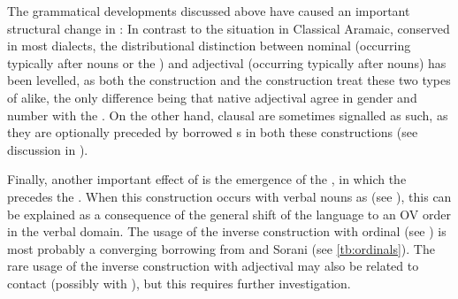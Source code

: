 The grammatical developments discussed above have caused an important structural change in \JSan: In contrast to the situation in Classical Aramaic, conserved in most  dialects, the distributional distinction between nominal \secns (occurring typically after \cst* nouns or the \lnk*) and adjectival \secns (occurring typically after \free* nouns) has been levelled, as both the \ez* construction and the  construction treat these two types of \secns alike, the only difference being that native adjectival \secns agree in gender and number with the \prim. On the other hand, clausal \secns are sometimes signalled as such, as they are optionally preceded by borrowed \rel*s in both these constructions (see discussion in ).






Finally, another important effect of  is the emergence of the , in which the \secn precedes the \prim. When this construction occurs with verbal nouns as \prims (see ), this can be explained as a consequence of the general shift of the language to an OV order in the verbal domain. The usage of the inverse construction with ordinal \secns (see ) is most probably a converging borrowing from  and Sorani (see \vref{tb:ordinals}). The rare usage of the inverse construction with adjectival \secns may also be related to contact (possibly with \Azr), but this requires further investigation.




